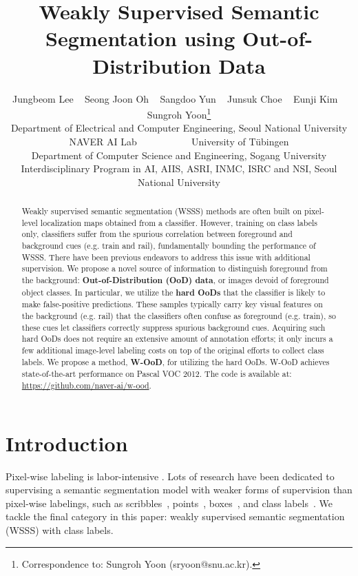 \documentclass[10pt,twocolumn,letterpaper]{article}
\begin{document}
\title{Weakly Supervised Semantic Segmentation using Out-of-Distribution Data}

\author{Jungbeom Lee ~ Seong Joon Oh ~ Sangdoo Yun ~ Junsuk Choe ~ Eunji Kim ~  Sungroh Yoon\thanks{Correspondence to: Sungroh Yoon (sryoon@snu.ac.kr).}\\
\small
Department of Electrical and Computer Engineering, Seoul National University\\
\small
NAVER AI Lab ~~~~~~~~~~
University of T\"ubingen\\
\small
Department of Computer Science and Engineering, Sogang University\\
\small
Interdisciplinary Program in AI, AIIS, ASRI, INMC, ISRC and NSI, Seoul National University\\
}
\maketitle


\begin{abstract}
Weakly supervised semantic segmentation (WSSS) methods are often built on pixel-level localization maps obtained from a classifier. However, training on class labels only, classifiers suffer from the spurious correlation between foreground and background cues (e.g. train and rail), fundamentally bounding the performance of WSSS. 
There have been previous endeavors to address this issue with additional supervision.
We propose a novel source of information to distinguish foreground from the background: \textbf{Out-of-Distribution (OoD) data}, or images devoid of foreground object classes. 
In particular, we utilize the \textbf{hard OoDs} that the classifier is likely to make false-positive predictions.
These samples typically carry key visual features on the background (e.g. rail) that the classifiers often confuse as foreground (e.g. train), so these cues let classifiers correctly suppress spurious background cues.
Acquiring such hard OoDs does not require an extensive amount of annotation efforts; it only incurs a few additional image-level labeling costs on top of the original efforts to collect class labels.
We propose a method, \textbf{W-OoD}, for utilizing the hard OoDs. 
W-OoD achieves state-of-the-art performance on Pascal VOC 2012.
The code is available at: \url{https://github.com/naver-ai/w-ood}.


\end{abstract}

\vspace{-1em}
\section{Introduction}
\label{sec:intro}
Pixel-wise labeling is labor-intensive \cite{cordts2016cityscapes}. Lots of research have been dedicated to supervising a semantic segmentation model with weaker forms of supervision than pixel-wise labelings, such as scribbles~\cite{tang2018normalized}, points~\cite{bearman2016s, kim2021beyond}, boxes~\cite{khoreva2017simple,song2019box, lee2021bbam}, and class labels~\cite{wang2020self, lee2021anti, lee2021reducing, lee2018robust}. 
We tackle the final category in this paper: weakly supervised semantic segmentation (WSSS) with class labels. 
\end{document}
